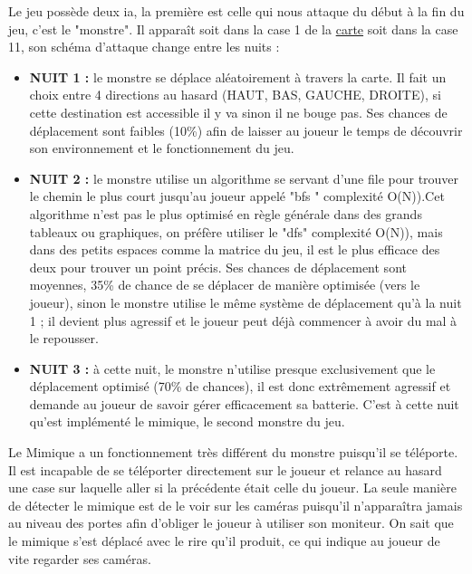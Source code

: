 \documentclass[11pt, a4paper]{article}
\begin{document}
Le jeu possède deux \acrshort{ia}, la première est celle qui nous attaque du début à la fin du jeu, c'est le "monstre". Il apparaît soit dans la case 1 de la \hyperref[fig:carte]{carte} soit dans la case 11, son schéma d'attaque change entre les nuits : 
\begin{itemize}

    \item\textbf{NUIT 1 : }le monstre se déplace aléatoirement à travers la carte. Il fait un choix entre 4 directions au hasard (HAUT, BAS, GAUCHE, DROITE), si cette destination est accessible il y va sinon il ne bouge pas.
    Ses chances de déplacement sont faibles (10\%) afin de laisser au joueur le temps de découvrir son environnement et le fonctionnement du jeu.\\
    
    \item\textbf{NUIT 2 : }le monstre utilise un algorithme se servant d'une file pour trouver le chemin le plus court jusqu'au joueur appelé "\acrshort{bfs} \cite{bib_bfs1} \cite{bib_bfs2}" complexité O(N)).Cet algorithme n'est pas le plus optimisé en règle générale dans des grands tableaux ou graphiques, on préfère utiliser le "\acrshort{dfs}\cite{bib_dfs}" complexité O(N)), mais dans des petits espaces comme la matrice du jeu, il est le plus efficace des deux pour trouver un point précis.
    Ses chances de déplacement sont moyennes, 35\% de chance de se déplacer de manière optimisée (vers le joueur), sinon le monstre utilise le même système de déplacement qu'à la nuit 1 ; il devient plus agressif et le joueur peut déjà commencer à avoir du mal à le repousser.\\
    
    \item\textbf{NUIT 3 : }à cette nuit, le monstre n'utilise presque exclusivement que le déplacement optimisé (70\% de chances), il est donc extrêmement agressif et demande au joueur de savoir gérer efficacement sa batterie.
    C'est à cette nuit qu'est implémenté le mimique, le second monstre du jeu.\\
\end{itemize}

    Le Mimique a un fonctionnement très différent du monstre puisqu'il se téléporte. Il est incapable de se téléporter directement sur le joueur et relance au hasard une case sur laquelle aller si la précédente était celle du joueur. La seule manière de détecter le mimique est de le voir sur les caméras puisqu'il n’apparaîtra jamais au niveau des portes afin d'obliger le joueur à utiliser son moniteur. On sait que le mimique s'est déplacé avec le rire qu'il produit, ce qui indique au joueur de vite regarder ses caméras.\\
\end{document}
